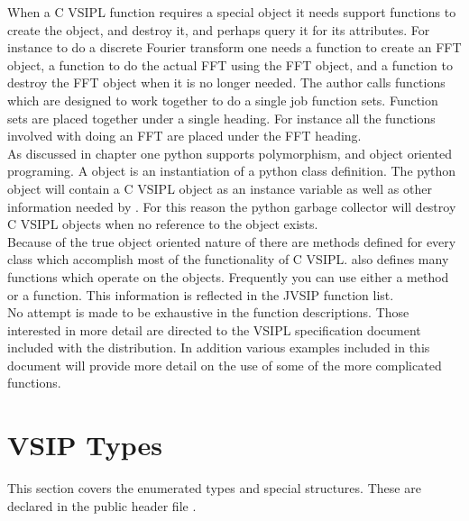 When a C VSIPL function requires a special object it needs support functions to create the object, and destroy it, and perhaps query it for its attributes. For instance to do a discrete Fourier transform one needs a function to create an FFT object, a function to do the actual FFT using the FFT object, and a function to destroy the FFT object when it is no longer needed. The author calls functions which are designed to work together to do a single job function sets. Function sets are placed together under a single heading. For instance all the functions involved with doing an FFT are placed under the FFT heading.\\[6pt]
As discussed in chapter one python supports polymorphism, and object oriented programing. A \pyjv{} object is an instantiation of a python class definition. The python object will contain a C VSIPL object as an instance variable as well as other information needed by \pyjv. For this reason the python garbage collector will destroy C VSIPL objects when no reference to the \pyjv{} object exists.\\[6pt]
Because of the true object oriented nature of \pyjv{} there are methods defined for every class which accomplish most of the functionality of C VSIPL.  also defines many functions which operate on the \pyjv{} objects. Frequently you can use either a method or a function. This information is reflected in the JVSIP function list.\\[6pt]
No attempt is made to be exhaustive in the function descriptions. Those interested in more detail are directed to the VSIPL specification document included with the \jv{} distribution. In addition various examples included in this document will provide more detail on the use of some of the more complicated functions.
\section*{VSIP Types}
This section covers the enumerated types and special structures. These are declared in the public header file .
%
